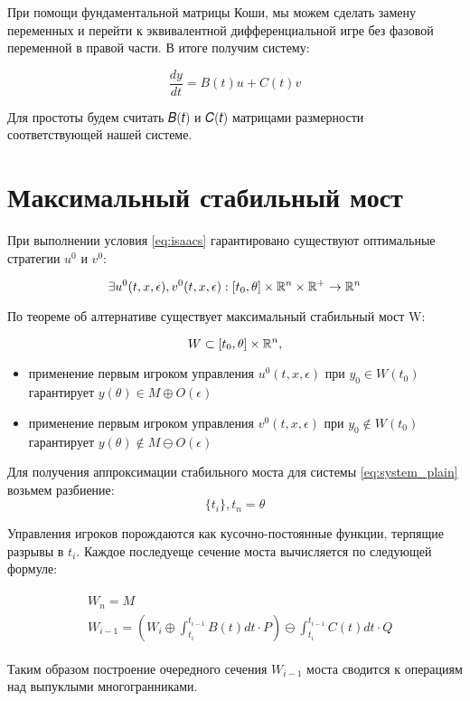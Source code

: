 При помощи фундаментальной матрицы Коши,
мы можем сделать замену переменных
и перейти к эквивалентной дифференциальной игре
без фазовой переменной в правой части.
В итоге получим систему:

\begin{equation}
    \label{eq:system_plain}
    \frac{dy}{dt} = B(t)u + C(t)v
\end{equation}

Для простоты будем считать 𝐵(𝑡) и 𝐶(𝑡) матрицами
размерности соответствующей нашей системе.

\section{Максимальный стабильный мост}

При выполнении условия \ref{eq:isaacs}
гарантировано существуют оптимальные стратегии
$u^0$ и $v^0$: 

\begin{equation}
    \exists u^0(t,x,\epsilon), v^0(t,x,\epsilon):
    [t_0, \theta] \times \mathbb{R}^n \times \mathbb{R}^+
    \rightarrow \mathbb{R}^n
\end{equation}

По теореме об алтернативе существует
максимальный стабильный мост W:

\begin{equation}
    W \subset [t_0,\theta] \times \mathbb{R}^n,
\end{equation}

\begin{itemize}
    \item применение первым игроком управления $u^0(t,x,\epsilon)$
    при $y_0 \in W(t_0)$ гарантирует $y(\theta) \in M \oplus O(\epsilon)$
    \item применение первым игроком управления $v^0(t,x,\epsilon)$
    при $y_0 \notin W(t_0)$ гарантирует $y(\theta) \notin M \ominus O(\epsilon)$
\end{itemize}

Для получения аппроксимации стабильного моста
для системы \ref{eq:system_plain} возьмем разбиение:
\begin{equation}
    \{t_i\}, t_n = \theta
\end{equation}

Управления игроков порождаются как кусочно-постоянные функции,
терпящие разрывы в $𝑡_i$.
Каждое последуеще сечение моста вычисляется по следующей формуле:

\begin{eqnarray}
    \begin{aligned}
        &W_n = M\\
        &W_{i-1} =
        \left(W_i \oplus \int_{t_i}^{t_{i-1}} B(t) dt \cdot P\right)
            \ominus
        \int_{t_i}^{t_{i-1}} C(t) dt \cdot Q
    \end{aligned}
\end{eqnarray}

Таким образом построение очередного сечения $W_{i-1}$ моста
сводится к операциям над выпуклыми многогранниками.